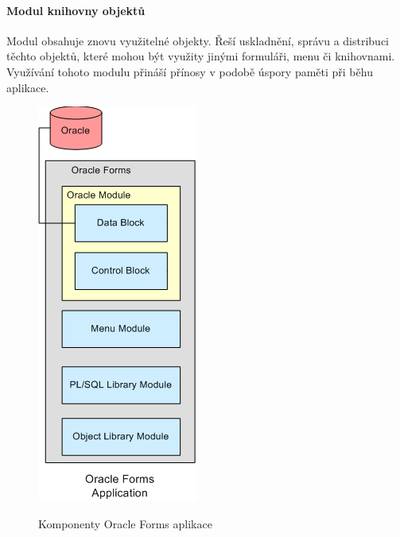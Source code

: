 \documentclass{diplomka}
\begin{document}
\paragraph{Modul knihovny objektů}
Modul obsahuje znovu využitelné objekty. Řeší uskladnění, správu a distribuci těchto objektů, které mohou být využity jinými formuláři, menu či knihovnami. Využívání tohoto modulu přináší přínosy v podobě úspory paměti při běhu aplikace.

\begin{figure}[H]
  \centering
  \includegraphics[scale=0.8]{obr/forms_arch3.png}
\label{obr:arch3}
\caption{Komponenty Oracle Forms aplikace\cite{microsoft}}
\end{figure}
\newpage
\end{document}

